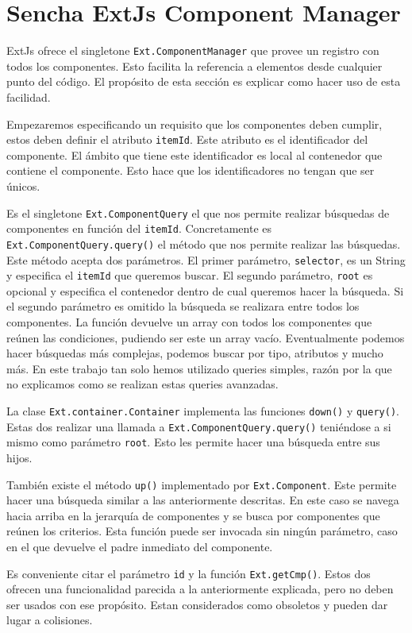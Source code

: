 \section{Sencha ExtJs Component Manager}
	ExtJs ofrece el singletone \texttt{Ext.ComponentManager} que provee un registro con todos los componentes. Esto facilita la referencia a
	elementos desde cualquier punto del código. El propósito de esta sección es explicar como hacer uso de esta facilidad.
	\par
	Empezaremos especificando un requisito que  los componentes deben cumplir, estos deben definir el atributo \texttt{itemId}. Este atributo es
	el identificador del componente. El ámbito que tiene este identificador es local al contenedor que contiene el componente. Esto hace que los
	identificadores no tengan que ser únicos. 
	\par
	Es el singletone \texttt{Ext.ComponentQuery} el que nos permite realizar búsquedas de componentes en función del \texttt{itemId}. Concretamente
	es \texttt{Ext.ComponentQuery.query()} el método que nos permite realizar las búsquedas. Este método acepta dos parámetros. El primer
	parámetro, \texttt{selector}, es un String y especifica el \texttt{itemId} que queremos buscar. El segundo parámetro, \texttt{root} es
	opcional y especifica el contenedor dentro de cual queremos hacer la búsqueda. Si el segundo parámetro es omitido la búsqueda se realizara
	entre todos los componentes. La función devuelve un array con todos los componentes que reúnen las condiciones, pudiendo ser este un array
	vacío. Eventualmente podemos hacer búsquedas más complejas, podemos buscar por tipo, atributos y mucho más. En este trabajo tan solo hemos
	utilizado queries simples, razón por la que no explicamos como se realizan estas queries avanzadas.
	\par
	La clase \texttt{Ext.container.Container} implementa las funciones \texttt{down()} y \texttt{query()}. Estas dos realizar una llamada a
	\texttt{Ext.ComponentQuery.query()} teniéndose a si mismo como parámetro \texttt{root}. Esto les permite hacer una búsqueda entre sus hijos.
	\par
	También existe el método \texttt{up()} implementado por \texttt{Ext.Component}. Este permite hacer una búsqueda similar a las anteriormente
	descritas. En este caso se navega hacia arriba en la jerarquía de componentes y se busca por componentes que reúnen los criterios. Esta
	función puede ser invocada sin ningún parámetro, caso en el que devuelve el padre inmediato del componente.
	\par
	Es conveniente citar el parámetro \texttt{id} y la función \texttt{Ext.getCmp()}. Estos dos ofrecen una funcionalidad parecida a la
	anteriormente explicada, pero no deben ser usados con ese propósito. Estan considerados como obsoletos y pueden dar lugar a colisiones. 

